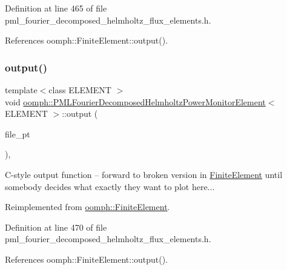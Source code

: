 Definition at line 465 of file pml\+\_\+fourier\+\_\+decomposed\+\_\+helmholtz\+\_\+flux\+\_\+elements.\+h.



References oomph\+::\+Finite\+Element\+::output().

\mbox{\label{classoomph_1_1PMLFourierDecomposedHelmholtzPowerMonitorElement_a41e6fd4956dd28d122e852ce6952746a}} 
\subsubsection{\texorpdfstring{output()}{output()}\hspace{0.1cm}{\footnotesize\ttfamily [3/4]}}
{\footnotesize\ttfamily template$<$class E\+L\+E\+M\+E\+NT $>$ \\
void \hyperlink{classoomph_1_1PMLFourierDecomposedHelmholtzPowerMonitorElement}{oomph\+::\+P\+M\+L\+Fourier\+Decomposed\+Helmholtz\+Power\+Monitor\+Element}$<$ E\+L\+E\+M\+E\+NT $>$\+::output (\begin{DoxyParamCaption}\item[{F\+I\+LE $\ast$}]{file\+\_\+pt }\end{DoxyParamCaption})\hspace{0.3cm}{\ttfamily [inline]}, {\ttfamily [virtual]}}

C-\/style output function -- forward to broken version in \hyperlink{classoomph_1_1FiniteElement}{Finite\+Element} until somebody decides what exactly they want to plot here... 

Reimplemented from \hyperlink{classoomph_1_1FiniteElement_a72cddd09f8ddbee1a20a1ff404c6943e}{oomph\+::\+Finite\+Element}.



Definition at line 470 of file pml\+\_\+fourier\+\_\+decomposed\+\_\+helmholtz\+\_\+flux\+\_\+elements.\+h.



References oomph\+::\+Finite\+Element\+::output().

\mbox{\label{classoomph_1_1PMLFourierDecomposedHelmholtzPowerMonitorElement_a53af82940246d4674642d22ff92735d5}} 
